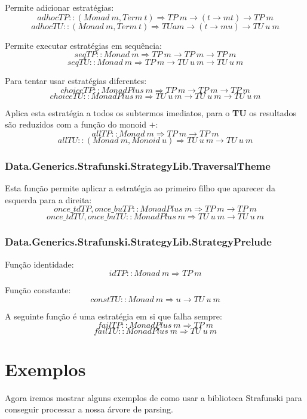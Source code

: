 Permite adicionar estratégias:
$$adhocTP :: (Monad~m, Term~t) \Rightarrow TP~m \rightarrow (t \rightarrow m t) \rightarrow TP~m$$
$$adhocTU :: (Monad~m, Term~t) \Rightarrow TU a m \rightarrow (t \rightarrow m u) \rightarrow TU~u~m$$

Permite executar estratégias em sequência:
$$seqTP :: Monad~m \Rightarrow TP~m \rightarrow TP~m \rightarrow TP~m$$
$$seqTU :: Monad~m \Rightarrow TP~m \rightarrow TU~u~m \rightarrow TU~u~m$$


Para tentar usar estratégias diferentes:
$$choiceTP :: MonadPlus~m \Rightarrow TP~m \rightarrow TP~m \rightarrow TP~m$$
$$choiceTU :: MonadPlus~m \Rightarrow TU~u~m \rightarrow TU~u~m \rightarrow TU~u~m$$

Aplica esta estratégia a todos os subtermos imediatos, para o \textbf{TU} os resultados são reduzidos com a função do monoid $+$:
$$allTP :: Monad~m \Rightarrow TP~m \rightarrow TP~m$$
$$allTU :: (Monad~m, Monoid~u) \Rightarrow TU~u~m \rightarrow TU~u~m$$

\subsubsection{Data.Generics.Strafunski.StrategyLib.TraversalTheme}

Esta função permite aplicar a estratégia ao primeiro filho que aparecer da esquerda para a direita:
$$once\_tdTP,once\_buTP :: MonadPlus~m \Rightarrow TP~m \rightarrow TP~m$$
$$once\_tdTU, once\_buTU :: MonadPlus~m \Rightarrow TU~u~m \rightarrow TU~u~m$$

\subsubsection{Data.Generics.Strafunski.StrategyLib.StrategyPrelude}

Função identidade:
$$idTP :: Monad~m \Rightarrow TP~m$$

Função constante:
$$constTU :: Monad~m \Rightarrow u \rightarrow TU~u~m$$

A seguinte função é uma estratégia em si que falha sempre:
$$failTP :: MonadPlus~m \Rightarrow TP~m$$
$$failTU :: MonadPlus~m \Rightarrow TU~u~m$$

\section{Exemplos}
Agora iremos mostrar alguns exemplos de como usar a biblioteca Strafunski para conseguir processar a nossa árvore de parsing.\\

